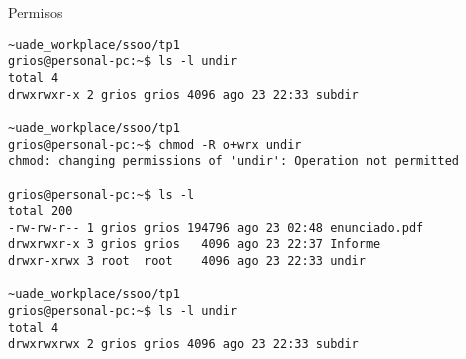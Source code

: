 \begin{section}{Permisos}
\begin{lstlisting}[style=Ubuntu]
~uade_workplace/ssoo/tp1
grios@personal-pc:~$ ls -l undir
total 4
drwxrwxr-x 2 grios grios 4096 ago 23 22:33 subdir

~uade_workplace/ssoo/tp1
grios@personal-pc:~$ chmod -R o+wrx undir
chmod: changing permissions of 'undir': Operation not permitted

grios@personal-pc:~$ ls -l
total 200
-rw-rw-r-- 1 grios grios 194796 ago 23 02:48 enunciado.pdf
drwxrwxr-x 3 grios grios   4096 ago 23 22:37 Informe
drwxr-xrwx 3 root  root    4096 ago 23 22:33 undir

~uade_workplace/ssoo/tp1
grios@personal-pc:~$ ls -l undir
total 4
drwxrwxrwx 2 grios grios 4096 ago 23 22:33 subdir


\end{lstlisting}

\end{section}